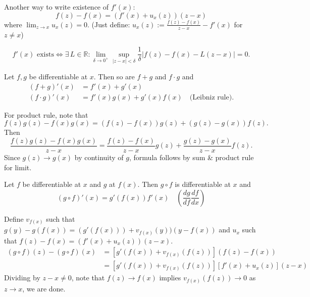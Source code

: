 \documentclass{notes}
\begin{document}
  Another way to write existence of $f'(x)$: 
  \[
    f(z) - f(x) = (f'(x) + u_x(z)) (z - x)
  \]
  where $\lim_{z \to x} u_x(z) = 0$.
  (Just define: $u_x(z) := \frac{f(z) - f(x)}{z - x} - f'(x)$ for $z \neq x$)
  
  \begin{lem}
    \[
      \text{$f'(x)$ exists} \Leftrightarrow \exists \, L \in \mathbb R: \lim_{\delta \to 0^+} \sup_{\left | z - x \right | < \delta} \frac{1}{\delta} \left | f(z) - f(x) - L (z - x) \right | = 0.
    \]
  \end{lem}
  
  \begin{lem}
    Let $f, g$ be differentiable at $x$.
    Then so are $f + g$ and $f \cdot g$ and 
    \begin{align*}
      (f + g)'(x) &= f'(x) + g'(x) \\ 
      (f \cdot g)'(x) &= f'(x) g(x) + g'(x) f(x) \quad \text{(Leibniz rule)}.
    \end{align*}
  \end{lem}
  
  \begin{prf} For product rule, note that  
    \[
      f(z) g(z) - f(x) g(x) = (f(z) - f(x)) g(z) + (g(z) - g(x)) f(z).
    \]
    Then 
    \[
      \frac{f(z) g(z) - f(x) g(x)}{z - x} = \frac{f(z) - f(x)}{z - x} g(z) + \frac{g(z) - g(x)}{z - x} f(z).
    \]
    Since $g(z) \to g(x)$ by continuity of $g$, formula follows by sum \& product rule for limit.
  \end{prf}
  
  \begin{lem}
    Let $f$ be differentiable at $x$ and $g$ at $f(x)$.
    Then $g \circ f$ is differentiable at $x$ and 
    \[
      (g \circ f)'(x) = g'(f(x)) f'(x) \quad \left ( \frac{dg}{df} \frac{df}{dx} \right )
    \]
  \end{lem}
  
  \begin{prf}
    Define $v_{f(x)}$ such that $g(y) - g(f(x)) = (g'(f(x))) + v_{f(x)}(y)) (y  - f(x))$ and $u_x$ such that $f(z) - f(x) = (f'(x) + u_x(z)) (z - x)$.
    \begin{align*}
      (g \circ f)(z) - (g \circ f)(x) &= [g'(f(x)) + v_{f(x)}(f(z))] (f(z) - f(x)) \\ 
      &= [g'(f(x)) + v_{f(x)}(f(z))] [f'(x) + u_x(z)] (z - x)
    \end{align*}
    Dividing by $z - x \neq 0$, note that $f(z) \to f(x)$ implies $v_{f(x)}(f(z)) \to 0$ as $z \to x$, we are done.
  \end{prf}
  
\end{document}
